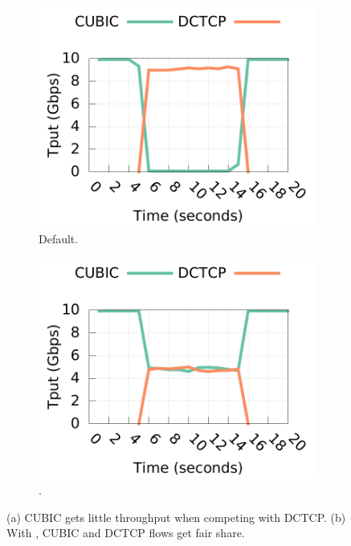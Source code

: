 \begin{figure}[!t]
        \centering
        \begin{subfigure}[b]{0.45\textwidth}
                \centering
                \includegraphics[width=\textwidth]{acdctcp/figures/micro2flows/coexitence/cubic_dctcp_coexistence_official.pdf}
                \caption{Default.}
                \label{coexistence_tput_ovs}
        \end{subfigure}
        \begin{subfigure}[b]{0.45\textwidth}
                \centering
                \includegraphics[width=\textwidth]{acdctcp/figures/micro2flows/coexitence/cubic_dctcp_coexistence_acdctcp.pdf}
                \caption{\acdc{}.}
                \label{coexistence_tput_ovsdctcp}
        \end{subfigure}
        \caption{(a) CUBIC gets little throughput when competing with DCTCP.
		 (b) With \acdc{}, CUBIC and DCTCP flows get fair share.}
        \label{coexistence_tput}
\end{figure}

